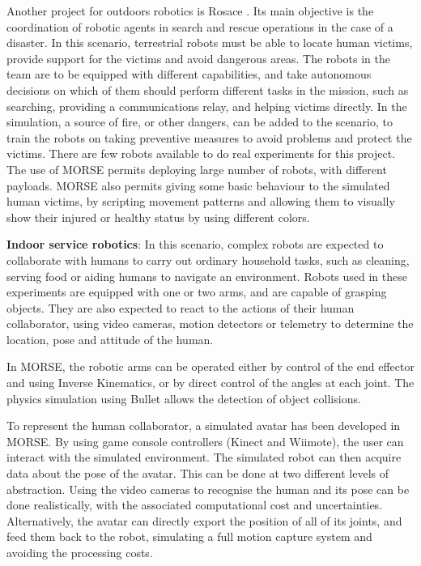 \documentclass{llncs}
\begin{document}
Another project for outdoors robotics is Rosace
\cite{springerlink:10.1007/978-3-642-12384-9_18,springerlink:10.1007/978-3-642-28786-2_32}.
Its main objective is the coordination of robotic agents in search and rescue
operations in the case of a disaster. In this scenario, terrestrial robots must
be able to locate human victims, provide support for the victims and avoid
dangerous areas. The robots in the team are to be equipped with different
capabilities, and take autonomous decisions on which of them should perform
different tasks in the mission, such as searching, providing a communications
relay, and helping victims directly.  In the simulation, a source of fire, or
other dangers, can be added to the scenario, to train the robots on taking
preventive measures to avoid problems and protect the victims.
There are few robots available to do real experiments for this project. The use
of MORSE permits deploying large number of robots, with different payloads.
MORSE also permits giving some basic behaviour to the simulated human victims,
by scripting movement patterns and allowing them to visually show their
injured or healthy status by using different colors.


\textbf{Indoor service robotics}: In this scenario, complex robots are expected
to collaborate with humans to carry out ordinary household tasks, such as
cleaning, serving food or aiding humans to navigate an environment.
Robots used in these experiments are equipped with one or two arms, and are
capable of grasping objects. They are also expected to react to the actions of
their human collaborator, using video cameras, motion detectors or telemetry to
determine the location, pose and attitude of the human.

In MORSE, the robotic arms can be operated either by control of the end
effector and using Inverse Kinematics, or by direct control of the angles at
each joint.  The physics simulation using Bullet allows the detection of object
collisions.

To represent the human collaborator, a simulated avatar has been developed in
MORSE. By using game console controllers (Kinect and Wiimote), the user can
interact with the simulated environment. The simulated robot can then acquire
data about the pose of the avatar. This can be done at two different levels of
abstraction. Using the video cameras to recognise the human and its pose can be
done realistically, with the associated computational cost and uncertainties.
Alternatively, the avatar can directly export the position of all of its
joints, and feed them back to the robot, simulating a full motion capture
system and avoiding the processing costs.
\end{document}
